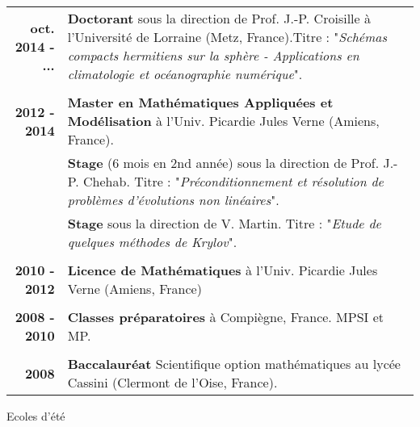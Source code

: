 \documentclass[10pt,a4paper]{report}
\begin{document}
\begin{center}
\begin{tabular}{r p{12cm}}
\textbf{oct. 2014 - ...} & \textbf{Doctorant} sous la direction de Prof. J.-P. Croisille à l'Université de Lorraine (Metz, France).\newline Titre : "\textit{Schémas compacts hermitiens sur la sphère - Applications en climatologie et océanographie numérique}".\\

& \\

\textbf{2012 - 2014} & \textbf{Master en Mathématiques Appliquées et Modélisation} à l'Univ. Picardie Jules Verne (Amiens, France). \\

& \textbf{Stage} (6 mois en 2nd année) sous la direction de Prof. J.-P. Chehab. \newline 
Titre : "\textit{Préconditionnement et résolution de problèmes d'évolutions non linéaires}". \\

& \textbf{Stage} sous la direction de V. Martin. \newline 
Titre : "\textit{Etude de quelques méthodes de Krylov}". \\

& \\

\textbf{2010 - 2012} & \textbf{Licence de Mathématiques} à l'Univ. Picardie Jules Verne (Amiens, France) \\

& \\

\textbf{2008 - 2010} & \textbf{Classes préparatoires} à Compiègne, France.\newline
MPSI et MP. \\

& \\

\textbf{2008} & \textbf{Baccalauréat} Scientifique option mathématiques au lycée Cassini (Clermont de l'Oise, France).\\
\end{tabular}
\end{center}

\vspace{1cm}
\noindent
{\selectfont
\begin{Large}
Ecoles d'été
\end{Large}
\hrulefill
}

\vspace{0.6cm}
\end{document}
